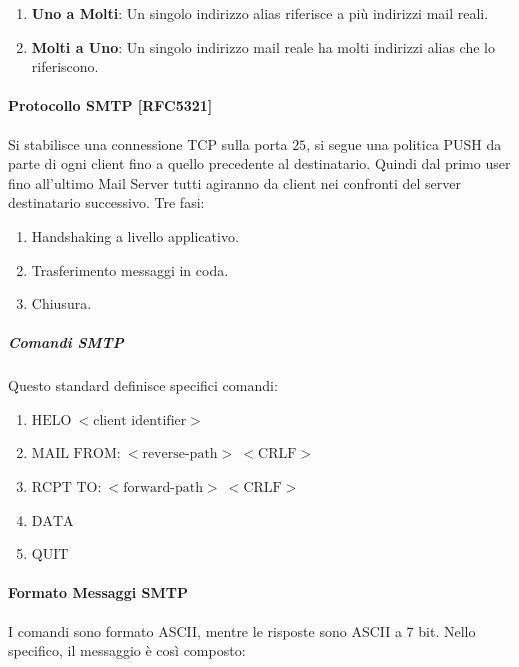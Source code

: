 \documentclass{article}
\begin{document}
\begin{enumerate}
    \item \textbf{Uno a Molti}: Un singolo indirizzo alias riferisce a più indirizzi mail reali.
    \item \textbf{Molti a Uno}: Un singolo indirizzo mail reale ha molti indirizzi alias che lo riferiscono.
\end{enumerate}

\paragraph{Protocollo SMTP [RFC5321]} Si stabilisce una connessione TCP sulla porta $25$, si segue una politica PUSH da parte di ogni client fino a quello precedente al destinatario. Quindi
dal primo user fino all'ultimo Mail Server tutti agiranno da client nei confronti del server destinatario successivo. Tre fasi:

\begin{enumerate}
    \item Handshaking a livello applicativo.
    \item Trasferimento messaggi in coda.
    \item Chiusura.
\end{enumerate}

\vspace*{-10px}

\subparagraph{Comandi SMTP} Questo standard definisce specifici comandi:

\begin{enumerate}
    \item $\text{HELO} \: < \text{client identifier} > $
    \item $\text{MAIL FROM:} \: < \text{reverse-path} > \: < \text{CRLF} > $
    \item $\text{RCPT TO:} \: < \text{forward-path} > \: < \text{CRLF} > $
    \item $\text{DATA}$
    \item $\text{QUIT}$
\end{enumerate}

\newpage

\paragraph{Formato Messaggi SMTP}

I comandi sono formato ASCII, mentre le risposte sono ASCII a 7 bit. Nello specifico, il messaggio è così composto:
\end{document}
